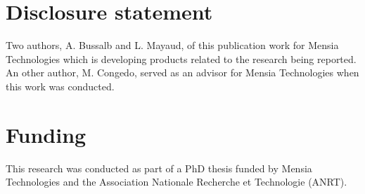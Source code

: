 
\section{Disclosure statement}

Two authors, A. Bussalb and L. Mayaud, of this publication work for Mensia Technologies which is developing products related to the research being reported.
An other author, M. Congedo, served as an advisor for Mensia Technologies when this work was conducted. 

\section{Funding}
This research was conducted as part of a PhD thesis funded by Mensia Technologies and the Association Nationale Recherche et Technologie (ANRT).
